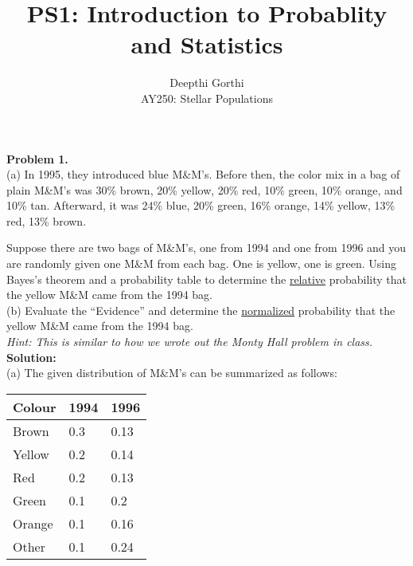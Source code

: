 \documentclass[12pt,usletter,english]{article}
\begin{document}
\title{PS1: Introduction to Probablity and Statistics} \author{Deepthi Gorthi\\ AY250: Stellar Populations} \maketitle

\noindent \textbf{Problem 1.} \\ 

(a) In 1995, they introduced blue M\&M's.  Before then, the color mix in a bag of plain M\&M's was 30\% brown, 20\% yellow, 20\% red, 10\% green, 10\% orange, and 10\% tan.  Afterward, it was 24\% blue, 20\% green, 16\% orange, 14\% yellow, 13\% red, 13\% brown.

Suppose there are two bags of M\&M's, one from 1994 and one from 1996 and you are randomly given one M\&M from each bag.  One is yellow, one is green.  Using Bayes's theorem and a probability table to determine the \underline{relative} probability that the yellow M\&M came from the 1994 bag. \\

(b) Evaluate the ``Evidence'' and determine the \underline{normalized} probability that the yellow M\&M came from the 1994 bag. \\

\noindent \textit{Hint: This is similar to how we wrote out the Monty Hall problem in class.} \\

\noindent \textbf{Solution:} \\

(a) The given distribution of M\&M's can be summarized as follows:

\begin{center}
\label{tab:mm}
\begin{tabular}{|l|l|l|}
\hline
Colour & 1994 & 1996 \\
\hline
Brown & 0.3 & 0.13 \\
\hline
Yellow & 0.2 & 0.14 \\
\hline
Red & 0.2 & 0.13 \\
\hline
Green & 0.1 & 0.2 \\
\hline
Orange & 0.1 & 0.16 \\
\hline
Other & 0.1 & 0.24 \\
\hline
\end{tabular}
\end{center}
\end{document}
